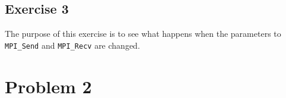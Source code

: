 \documentclass[11pt]{article}
\begin{document}
	
	
	\pagebreak
	\subsection{Exercise 3}
	The purpose of this exercise is to see what happens when the parameters to \texttt{MPI\_Send} and \texttt{MPI\_Recv} are changed.
	

\pagebreak
\section{Problem 2}

\end{document}
